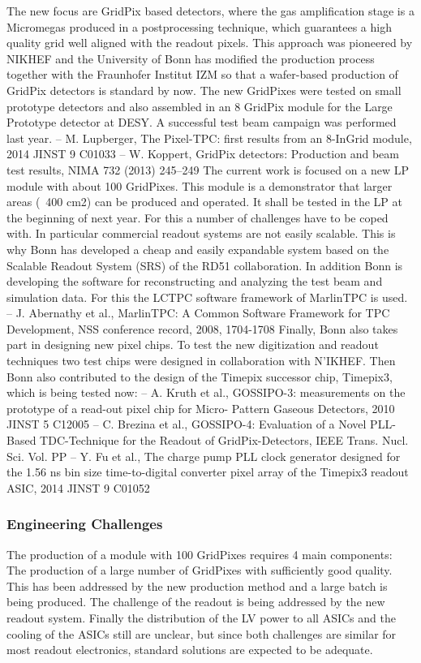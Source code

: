 The new focus are GridPix based detectors, where the gas amplification stage is a Micromegas produced in a postprocessing technique, which guarantees a high quality grid well aligned with the readout pixels. This approach was pioneered by NIKHEF and the University of Bonn has modified the production process together with the Fraunhofer Institut IZM so that a wafer-based production of GridPix detectors is standard by now. The new GridPixes were tested on small prototype detectors and also assembled in an 8 GridPix module for the Large Prototype detector at DESY. A successful test beam campaign was performed last year.
– M. Lupberger, The Pixel-TPC: first results from an 8-InGrid module, 2014 JINST 9 C01033
– W. Koppert, GridPix detectors: Production and beam test results, NIMA 732 (2013) 245–249 The current work is focused on a new LP module with about 100 GridPixes. This module is a demonstrator that larger areas (~400 cm2) can be produced and operated. It shall be tested in the LP at the beginning of next year. For this a number of challenges have to be coped with. In particular commercial readout systems are not easily scalable. This is why Bonn has developed a cheap and easily expandable system based on the Scalable Readout System (SRS) of the RD51 collaboration.
In addition Bonn is developing the software for reconstructing and analyzing the test beam and simulation data. For this the LCTPC software framework of MarlinTPC is used.
– J. Abernathy et al., MarlinTPC: A Common Software Framework for TPC Development, NSS conference record, 2008, 1704-1708
Finally, Bonn also takes part in designing new pixel chips. To test the new digitization and readout techniques two test chips were designed in collaboration with N'IKHEF. Then Bonn also contributed to the design of the Timepix successor chip, Timepix3, which is being tested now:
– A. Kruth et al., GOSSIPO-3: measurements on the prototype of a read-out pixel chip for Micro- Pattern Gaseous Detectors, 2010 JINST 5 C12005
– C. Brezina et al., GOSSIPO-4: Evaluation of a Novel PLL-Based TDC-Technique for the Readout of GridPix-Detectors, IEEE Trans. Nucl. Sci. Vol. PP
– Y. Fu et al., The charge pump PLL clock generator designed for the 1.56 ns bin size time-to-digital converter pixel array of the Timepix3 readout ASIC, 2014 JINST 9 C01052
\subsubsection{Engineering Challenges}
The production of a module with 100 GridPixes requires 4 main components: The production of a
large number of GridPixes with sufficiently good quality. This has been addressed by the new production method and a large batch is being produced. The challenge of the readout is being addressed by the new readout system. Finally the distribution of the LV power to all ASICs and the cooling of the ASICs still are unclear, but since both challenges are similar for most readout electronics, standard solutions are expected to be adequate.

